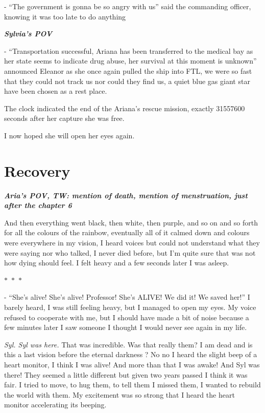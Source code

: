 \documentclass[colorlinks,12pt,a4paper]{book}
\newcommand\sep{\begin{center}
  \boldmath $\ast$~$\ast$~$\ast$
\end{center}}
\begin{document}
 - “The government is gonna be so angry with us” said the commanding officer, knowing it was too late to do anything\par
 \bigskip
 
 \textit{\textbf{Sylvia's POV}}\par
 \bigskip
 
 - “Transportation successful, Ariana has been transferred to the medical bay as her state seems to indicate drug abuse, 
 her survival at this moment is unknown” announced Eleanor as she once again pulled the ship into FTL, we were so fast that 
 they could not track us nor could they find us, a quiet blue gas giant star have been chosen as a rest place.\par
 \bigskip
 
 The clock indicated the end of the Ariana's rescue mission, exactly 31557600 seconds after her capture she was free.\par
 \bigskip
 
 I now hoped she will open her eyes again.\par
 \bigskip
 
 \chapter{Recovery}
 
 \textit{\textbf{Aria's POV, TW: mention of death, mention of menstruation, just after the chapter 6}}\par
 \bigskip
 
 And then everything went black, then white, then purple, and so on and so forth for all the colours of the rainbow, 
 eventually all of it calmed down and colours were everywhere in my vision, I heard voices but could not understand 
 what they were saying nor who talked, I never died before, but I'm quite sure that was not how dying should feel. 
 I felt heavy and a few seconds later I was asleep. 
 
 \sep
 
 - “She's alive! She's alive! Professor! She's ALIVE! We did it! We saved her!” I barely heard, I was still 
 feeling heavy, but I managed to open my eyes. My voice refused to cooperate with me, but I should have made a bit of 
 noise because a few minutes later I saw someone I thought I would never see again in my life.\par
 \bigskip
 
 \textit{Syl. Syl was here.} That was incredible. Was that really them? I am dead and is this a last vision before 
 the eternal darkness ? No no I heard the slight beep of a heart monitor, I think I was alive! And more than that 
 I was awake! And Syl was there! They seemed a little different but given two years passed I think it was fair. 
 I tried to move, to hug them, to tell them I missed them, I wanted to rebuild the world with them. My excitement was 
 so strong that I heard the heart monitor accelerating its beeping. \par
 \bigskip
 
\end{document}
